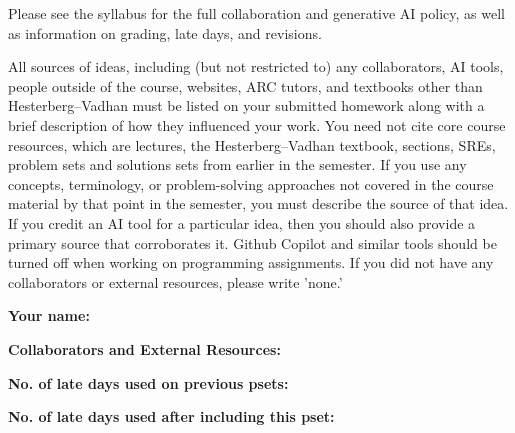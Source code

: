 \documentclass[11pt]{article}
\begin{document}

Please see the syllabus for the full collaboration and generative AI policy, as well as information on grading, late days, and revisions.

All sources of ideas, including (but not restricted to) any collaborators, AI tools, people outside of the course, websites, ARC tutors, and textbooks other than Hesterberg--Vadhan must be listed on your submitted homework along with a brief description of how they influenced your work. You need not cite core course resources, which are lectures, the Hesterberg--Vadhan textbook, sections, SREs, problem sets and solutions sets from earlier in the semester. If you use any concepts, terminology, or problem-solving approaches not covered in the course material by that point in the semester, you must describe the source of that idea. If you credit an AI tool for a particular idea, then you should also provide a primary source that corroborates it. Github Copilot and similar tools should be turned off when working on programming assignments. If you did not have any collaborators or external resources, please write 'none.'

\vspace{1em}

\textbf{Your name: }

\textbf{Collaborators and External Resources:}

\textbf{No. of late days used on previous psets: }

\textbf{No. of late days used after including this pset: }
\end{document}
